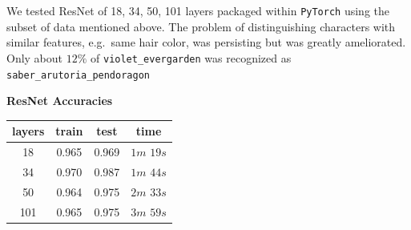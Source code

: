 \documentclass[11.5pt]{article}
\begin{document}
\begin{enumerate}
\begin{itemize}
            \vspace{3mm}

            \begin{minipage}{0.45\textwidth}
                We tested ResNet of 18, 34, 50, 101 layers packaged within \texttt{PyTorch} using the subset of data mentioned above.
                The problem of distinguishing characters with similar features, e.g.\ same hair color, was persisting but was greatly ameliorated.
                Only about $12\%$ of \texttt{violet\_evergarden} was recognized as \texttt{saber\_arutoria\_pendoragon}
            \end{minipage}
            \begin{minipage}{0.45\textwidth}
                \begin{center}
                    \textbf{ResNet Accuracies}
                \end{center}           
                \begin{tabular}{|c|c|c|c|}
                    \hline
                    layers & train & test & time \\ \hline
                    18 & 0.965 & 0.969 & $1m$ $19s$ \\ \hline
                    34  & 0.970 & 0.987 & $1m$ $44s$ \\ \hline
                    50 & 0.964 & 0.975 & $2m$ $33s$ \\ \hline
                    101 & 0.965 & 0.975 & $3m$ $59s$ \\ \hline
                \end{tabular}
            \end{minipage}          
        \end{itemize}
    \end{enumerate}
\end{document}
